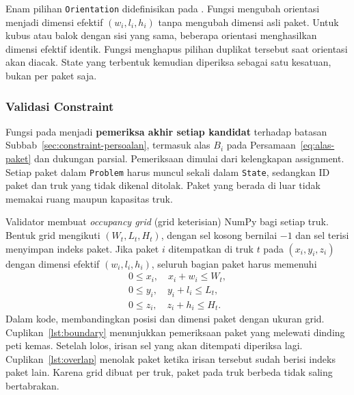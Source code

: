 \documentclass[12pt,a4paper]{article}
\begin{document}


Enam pilihan \texttt{Orientation} didefinisikan pada . Fungsi  mengubah orientasi menjadi dimensi efektif $(w_i,l_i,h_i)$ tanpa mengubah dimensi asli paket. Untuk kubus atau balok dengan sisi yang sama, beberapa orientasi menghasilkan dimensi efektif identik. Fungsi  menghapus pilihan duplikat tersebut saat orientasi akan diacak. State yang terbentuk kemudian diperiksa sebagai satu kesatuan, bukan per paket saja.

\subsubsection{Validasi Constraint}
Fungsi  pada  menjadi \textbf{pemeriksa akhir setiap kandidat} terhadap batasan Subbab~\ref{sec:constraint-persoalan}, termasuk alas $B_i$ pada Persamaan~\ref{eq:alas-paket} dan dukungan parsial. Pemeriksaan dimulai dari kelengkapan assignment. Setiap paket dalam \texttt{Problem} harus muncul sekali dalam \texttt{State}, sedangkan ID paket dan truk yang tidak dikenal ditolak. Paket yang berada di luar tidak memakai ruang maupun kapasitas truk.

Validator membuat \textit{occupancy grid} (grid keterisian) NumPy bagi setiap truk. Bentuk grid mengikuti $(W_t,L_t,H_t)$, dengan sel kosong bernilai $-1$ dan sel terisi menyimpan indeks paket. Jika paket $i$ ditempatkan di truk $t$ pada $(x_i,y_i,z_i)$ dengan dimensi efektif $(w_i,l_i,h_i)$, seluruh bagian paket harus memenuhi
\begin{equation}
\begin{aligned}
0\leq x_i,\quad x_i+w_i\leq W_t,\\
0\leq y_i,\quad y_i+l_i\leq L_t,\\
0\leq z_i,\quad z_i+h_i\leq H_t.
\end{aligned}
\label{eq:batas-truk}
\end{equation}
Dalam kode,  membandingkan posisi dan dimensi paket dengan ukuran grid. Cuplikan~\ref{lst:boundary} menunjukkan pemeriksaan paket yang melewati dinding peti kemas. Setelah lolos, irisan sel yang akan ditempati diperiksa lagi. Cuplikan~\ref{lst:overlap} menolak paket ketika irisan tersebut sudah berisi indeks paket lain. Karena grid dibuat per truk, paket pada truk berbeda tidak saling bertabrakan.
\end{document}
